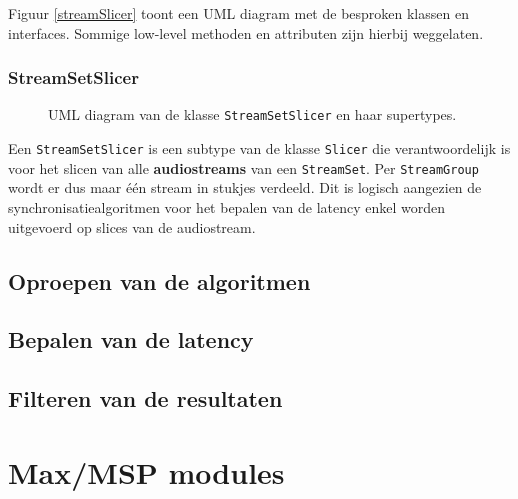 Figuur \ref{streamSlicer} toont een UML diagram met de besproken klassen en interfaces. Sommige low-level methoden en attributen zijn hierbij weggelaten. 

\subsubsection{StreamSetSlicer}

\begin{figure}[h!]
	\captionsetup{width=0.7\textwidth}
	\caption{UML diagram van de klasse \texttt{StreamSetSlicer} en haar supertypes.}
	\begin{center}
		\advance\parskip0.3cm
		
	\end{center}
	\label{streamSetSlicer}
\end{figure}

Een \texttt{StreamSetSlicer} is een subtype van de klasse \texttt{Slicer} die verantwoordelijk is voor het slicen van alle \textbf{audiostreams} van een \texttt{StreamSet}. Per \texttt{StreamGroup} wordt er dus maar één stream in stukjes verdeeld. Dit is logisch aangezien de synchronisatiealgoritmen voor het bepalen van de latency enkel worden uitgevoerd op slices van de audiostream.

\subsection{Oproepen van de algoritmen}

\subsection{Bepalen van de latency}

\subsection{Filteren van de resultaten}

\section{Max/MSP modules}


